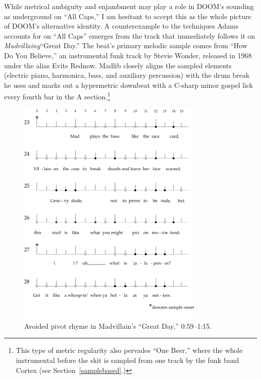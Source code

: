 While metrical ambiguity and enjambment may play a role in DOOM's sounding as underground on ``All Caps,''
I am hesitant to accept this as the whole picture of DOOM's alternative identity. A counterexample to the
techniques Adams accounts for on ``All Caps'' emerges from the track that immediately follows it on 
\textit{Madvillainy}\textemdash ``Great Day.'' The beat's primary melodic sample comes from ``How Do You 
Believe,'' an instrumental funk track by Stevie Wonder, released in 1968 under the alias Evits Rednow. Madlib
closely aligns the sampled elements (electric piano, harmonica, bass, and auxiliary percussion) with the drum
break he uses and marks out a hypermetric downbeat with a C-sharp minor gospel lick every fourth bar in the A
section.\footnote{
    This type of metric regularity also pervades ``One Beer,'' where the whole
    instrumental before the skit is sampled from one track by the funk band Cortex 
    (see Section~\ref{samplebased}.)}
    
    \begin{figure}[!t]
        \centering
        \includegraphics[width=0.8\textwidth]{images/figures/chp 03/059115greatdayavoidedpivot.pdf}
        \caption{Avoided pivot rhyme in Madvillain's ``Great Day,'' 0:59--1:15.}
        \label{fig:doomavoidedpiv}
    \end{figure}

